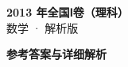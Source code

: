\documentclass[zihao=-4, a4paper]{ctexart}
\begin{document}
\begin{center}
  {\Large\bfseries 2013 年全国Ⅰ卷（理科）}\\[4pt]
  {\large 数学 · 解析版}
\end{center}
\medskip
{}

\clearpage
{}
\begin{center}{\Large\bfseries 参考答案与详细解析}\end{center}
\medskip

\end{document}

